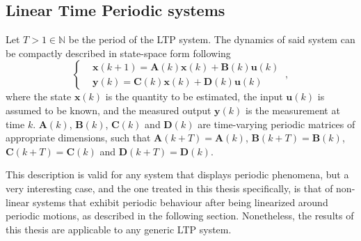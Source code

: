 \subsection{Linear Time Periodic systems}
\par
Let $T>1 \in \mathbb{N}$ be the period of the LTP system. The dynamics of said system can be compactly described in state-space form following
\begin{equation} \label{eq:3.1}
\begin{cases}
      &\boldsymbol{x}(k+1)=\boldsymbol{A}(k)\boldsymbol{x}(k)+\boldsymbol{B}(k)\boldsymbol{u}(k)\\
      &\boldsymbol{y}(k)=\boldsymbol{C}(k)\boldsymbol{x}(k)+\boldsymbol{D}(k)\boldsymbol{u}(k)
\end{cases} \ ,
\end{equation}
where the state $\boldsymbol{x}(k)$ is the quantity to be estimated, the input $\boldsymbol{u}(k)$ is assumed to be known, and the measured output $\boldsymbol{y}(k)$ is the measurement at time $k$. $\boldsymbol{A}(k)$, $\boldsymbol{B}(k)$, $\boldsymbol{C}(k)$ and $\boldsymbol{D}(k)$ are time-varying periodic matrices of appropriate dimensions, such that $\boldsymbol{A}(k+T)=\boldsymbol{A}(k)$, $\boldsymbol{B}(k+T)=\boldsymbol{B}(k)$, $\boldsymbol{C}(k+T)=\boldsymbol{C}(k)$ and
$\boldsymbol{D}(k+T)=\boldsymbol{D}(k)$.
\par
This description is valid for any system that displays periodic phenomena, but a very interesting case, and the one treated in this thesis specifically, is that of non-linear systems that exhibit periodic behaviour after being linearized around periodic motions, as described in the following section. Nonetheless, the results of this thesis are applicable to any generic LTP system.

